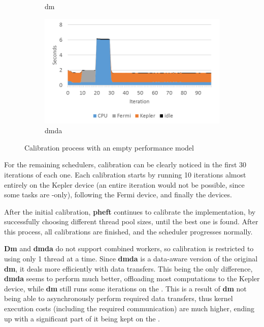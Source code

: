 \documentclass[main.tex]{subfiles}
\begin{document}
\begin{figure}[!htp]
\begin{subfigure}{.5\textwidth}
    \caption{dm \label{fig:prof:starpu_calibrate_dm}}
  \end{subfigure}%
  \begin{subfigure}{.5\textwidth}
    \centering
    \includegraphics[width=\linewidth]{profiling/starpu_calibrate_dmda}
    \caption{dmda \label{fig:prof:starpu_calibrate_dmda}}
  \end{subfigure}
  \caption{Calibration process with an empty performance model \label{fig:prof:starpu_calibrate}}
\end{figure}

For the remaining schedulers, calibration can be clearly noticed in the first 30 iterations of each one. Each calibration starts by running 10 iterations almost entirely on the Kepler device (an entire iteration would not be possible, since some tasks are \cpu-only), following the Fermi device, and finally the \cpu devices.

After the initial calibration, \textbf{pheft} continues to calibrate the \cpu implementation, by successfully choosing different thread pool sizes, until the best one is found. After this process, all calibrations are finished, and the scheduler progresses normally.

\textbf{Dm} and \textbf{dmda} do not support combined workers, so \cpu calibration is restricted to using only 1 \cpu thread at a time. Since \textbf{dmda} is a data-aware version of the original \textbf{dm}, it deals more efficiently with data transfers. This being the only difference, \textbf{dmda} seems to perform much better, offloading most computations to the Kepler device, while \textbf{dm} still runs some iterations on the \cpu. This is a result of \textbf{dm} not being able to asynchronously perform required data transfers, thus \cuda kernel execution costs (including the required communication) are much higher, ending up with a significant part of it being kept on the \cpu.
\end{document}
